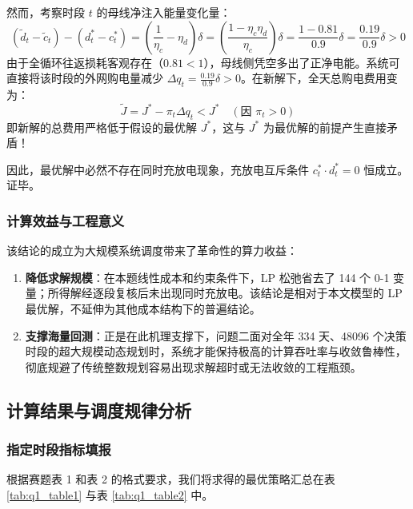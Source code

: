 \documentclass[withoutpreface]{cumcmthesis}
\begin{document}
然而，考察时段 $t$ 的母线净注入能量变化量：
\begin{equation}
    (\widetilde{d}_t - \widetilde{c}_t) - (d_t^* - c_t^*) = \left( \frac{1}{\eta_c} - \eta_d \right) \delta = \left( \frac{1 - \eta_c \eta_d}{\eta_c} \right) \delta = \frac{1 - 0.81}{0.9} \delta = \frac{0.19}{0.9} \delta > 0
\end{equation}
由于全循环往返损耗客观存在（$0.81 < 1$），母线侧凭空多出了正净电能。系统可直接将该时段的外网购电量减少 $\Delta q_t = \frac{0.19}{0.9}\delta > 0$。在新解下，全天总购电费用变为：
\begin{equation}
    \widetilde{J} = J^* - \pi_t \Delta q_t < J^* \quad (\text{因 } \pi_t > 0)
\end{equation}
即新解的总费用严格低于假设的最优解 $J^*$，这与 $J^*$ 为最优解的前提产生直接矛盾！

因此，最优解中必然不存在同时充放电现象，充放电互斥条件 $c_t^* \cdot d_t^* = 0$ 恒成立。证毕。

\subsubsection{计算效益与工程意义}
该结论的成立为大规模系统调度带来了革命性的算力收益：
\begin{enumerate}
    \item \textbf{降低求解规模}：在本题线性成本和约束条件下，LP 松弛省去了 144 个 0-1 变量；所得解经逐段复核后未出现同时充放电。该结论是相对于本文模型的 LP 最优解，不延伸为其他成本结构下的普遍结论。
    \item \textbf{支撑海量回测}：正是在此机理支撑下，问题二面对全年 334 天、48096 个决策时段的超大规模动态规划时，系统才能保持极高的计算吞吐率与收敛鲁棒性，彻底规避了传统整数规划容易出现求解超时或无法收敛的工程瓶颈。
\end{enumerate}
\subsection{计算结果与调度规律分析}

\subsubsection{指定时段指标填报}

根据赛题表 1 和表 2 的格式要求，我们将求得的最优策略汇总在表 \ref{tab:q1_table1} 与表 \ref{tab:q1_table2} 中。
\end{document}
